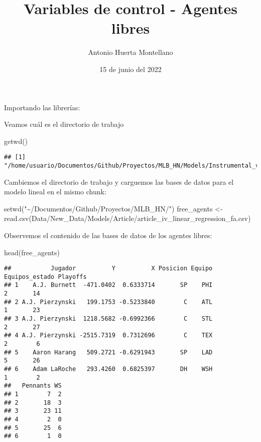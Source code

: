 \documentclass[
]{article}
\title{Variables de control - Agentes libres}
\author{Antonio Huerta Montellano}
\date{15 de junio del 2022}
\newenvironment{Shaded}{\begin{snugshade}}{\end{snugshade}}
\newcommand{\FunctionTok}[1]{\textcolor[rgb]{0.00,0.00,0.00}{#1}}
\newcommand{\NormalTok}[1]{#1}
\newcommand{\OtherTok}[1]{\textcolor[rgb]{0.56,0.35,0.01}{#1}}
\newcommand{\StringTok}[1]{\textcolor[rgb]{0.31,0.60,0.02}{#1}}
\begin{document}
\maketitle

Importando las librerías:

Veamos cuál es el directorio de trabajo

\begin{Shaded}
\begin{Highlighting}[]
\FunctionTok{getwd}\NormalTok{()}
\end{Highlighting}
\end{Shaded}

\begin{verbatim}
## [1] "/home/usuario/Documentos/Github/Proyectos/MLB_HN/Models/Instrumental_variables/Free_agent"
\end{verbatim}

Cambiemos el directorio de trabajo y carguemos las bases de datos para
el modelo lineal en el mismo chunk:

\begin{Shaded}
\begin{Highlighting}[]
\FunctionTok{setwd}\NormalTok{(}\StringTok{"\textasciitilde{}/Documentos/Github/Proyectos/MLB\_HN/"}\NormalTok{)}
\NormalTok{free\_agents }\OtherTok{\textless{}{-}} \FunctionTok{read.csv}\NormalTok{(}\StringTok{\textquotesingle{}Data/New\_Data/Models/Article/article\_iv\_linear\_regression\_fa.csv\textquotesingle{}}\NormalTok{)}
\end{Highlighting}
\end{Shaded}

Observemos el contenido de las bases de datos de los agentes libres:

\begin{Shaded}
\begin{Highlighting}[]
\FunctionTok{head}\NormalTok{(free\_agents)}
\end{Highlighting}
\end{Shaded}

\begin{verbatim}
##           Jugador          Y          X Posicion Equipo Equipos_estado Playoffs
## 1    A.J. Burnett  -471.0402  0.6333714       SP    PHI              2       14
## 2 A.J. Pierzynski   199.1753 -0.5233840        C    ATL              1       23
## 3 A.J. Pierzynski  1218.5682 -0.6992366        C    STL              2       27
## 4 A.J. Pierzynski -2515.7319  0.7312696        C    TEX              2        6
## 5    Aaron Harang   509.2721 -0.6291943       SP    LAD              5       26
## 6    Adam LaRoche   293.4260  0.6825397       DH    WSH              1        2
##   Pennants WS
## 1        7  2
## 2       18  3
## 3       23 11
## 4        2  0
## 5       25  6
## 6        1  0
\end{verbatim}
\end{document}
